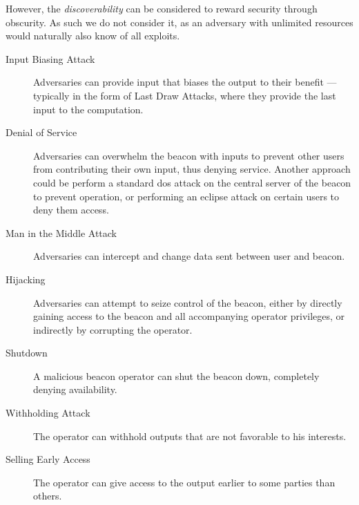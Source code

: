 However, the \emph{discoverability} can be considered to reward security through obscurity. As such we do not consider it, as an adversary with unlimited resources would naturally also know of all exploits.
\begin{description}
    \item [Input Biasing Attack] Adversaries can provide input that biases the output to their benefit --- typically in the form of Last Draw Attacks, where they provide the last input to the computation.
    \item [Denial of Service] Adversaries can overwhelm the beacon with inputs to prevent other users from contributing their own input, thus denying service. Another approach could be perform a standard \gls{dos} attack on the central server of the beacon to prevent operation, or performing an eclipse attack on certain users to deny them access.
    \item [Man in the Middle Attack] Adversaries can intercept and change data sent between user and beacon.
    \item [Hijacking] Adversaries can attempt to seize control of the beacon, either by directly gaining access to the beacon and all accompanying operator privileges, or indirectly by corrupting the operator.
    \item [Shutdown] A malicious beacon operator can shut the beacon down, completely denying availability.
    \item [Withholding Attack] The operator can withhold outputs that are not favorable to his interests.
    \item [Selling Early Access] The operator can give access to the output earlier to some parties than others.

\end{description}
